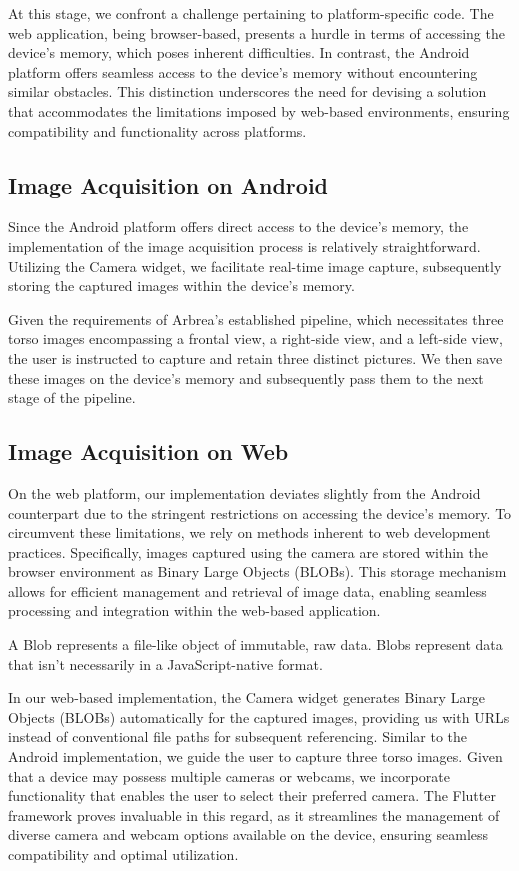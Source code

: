 At this stage, we confront a challenge pertaining to platform-specific code. The web application, being browser-based, presents a hurdle in terms of accessing the device's memory, 
which poses inherent difficulties. In contrast, the Android platform offers seamless access to the device's memory without encountering similar obstacles. 
This distinction underscores the need for devising a solution that accommodates the limitations imposed by web-based environments, ensuring compatibility and functionality across platforms.

\subsection{Image Acquisition on Android}

Since the Android platform offers direct access to the device's memory, the implementation of the image acquisition process is relatively straightforward. 
Utilizing the Camera widget, we facilitate real-time image capture, subsequently storing the captured images within the device's memory. 

Given the requirements of Arbrea's established pipeline, 
which necessitates three torso images encompassing a frontal view, a right-side view, and a left-side view, the user is instructed to capture and retain three distinct pictures. 
We then save these images on the device's memory and subsequently pass them to the next stage of the pipeline.

\subsection{Image Acquisition on Web}

On the web platform, our implementation deviates slightly from the Android counterpart due to the stringent restrictions on accessing the device's memory. 
To circumvent these limitations, we rely on methods inherent to web development practices. Specifically, images captured using the camera are stored within the browser environment as Binary Large Objects (BLOBs). 
This storage mechanism allows for efficient management and retrieval of image data, enabling seamless processing and integration within the web-based application.

A Blob represents a file-like object of immutable, raw data. Blobs represent data that isn't necessarily in a JavaScript-native format. 

In our web-based implementation, the Camera widget generates Binary Large Objects (BLOBs) automatically for the captured images, providing us with URLs instead of conventional file paths for subsequent referencing. 
Similar to the Android implementation, we guide the user to capture three torso images. Given that a device may possess multiple cameras or webcams, we incorporate functionality that enables the user 
to select their preferred camera. The Flutter framework proves invaluable in this regard, as it streamlines the management of diverse camera and webcam options available on the device, 
ensuring seamless compatibility and optimal utilization.

